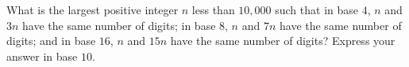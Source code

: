 What is the largest positive integer $n$ less than $10,000$ such that in base $4$, $n$ and $3n$ have the same number of digits; in base $8$, $n$ and $7n$ have the same number of digits; and in base $16$, $n$ and $15n$ have the same number of digits? Express your answer in base $10$. 
